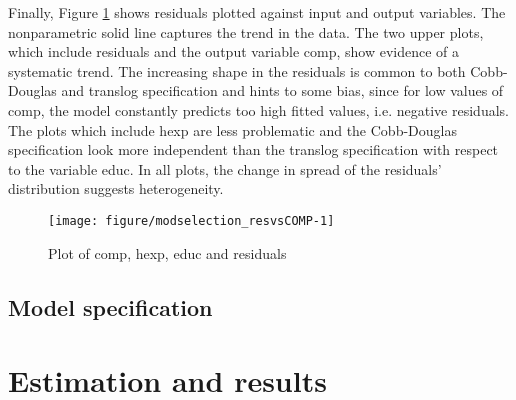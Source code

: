 \documentclass[12pt,a4paper]{article}\usepackage[]{graphicx}\usepackage[]{color}
\newenvironment{knitrout}{}{} %
\begin{document}
Finally, Figure \ref{fig:modselection_resvsCOMP} shows residuals plotted against input and output variables. The nonparametric solid line captures the trend in the data. The two upper plots, which include residuals and the output variable comp, show evidence of a systematic trend. The increasing shape in the residuals is common to both Cobb-Douglas and translog specification and hints to some bias, since for low values of comp, the model constantly predicts too high fitted values, i.e. negative residuals. The plots which include hexp are less problematic and the Cobb-Douglas specification look more independent than the translog specification with respect to the variable educ. In all plots, the change in spread of the residuals' distribution suggests heterogeneity.

\begin{knitrout}
\color{fgcolor}\begin{figure}[htbp]

{\centering \texttt{[image: figure/modselection\_resvsCOMP-1]} 

}

\caption[Plot of comp, hexp, educ and residuals]{Plot of comp, hexp, educ and residuals}\label{fig:modselection_resvsCOMP}
\end{figure}


\end{knitrout}











\subsection{Model specification}












\section{Estimation and results}
\end{document}
